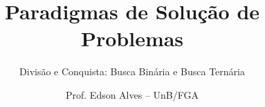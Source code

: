 \title{Paradigmas de Solução de Problemas}
\subtitle{Divisão e Conquista: Busca Binária e Busca Ternária}
\author{Prof. Edson Alves -- UnB/FGA}
\date{}
